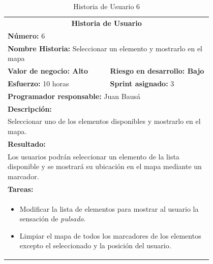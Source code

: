 	\begin{table}[H]
	  \centering 
	 	\begin{tabular}{p{0.4\linewidth}p{0.4\linewidth}}
	    \toprule
	    \multicolumn{2}{c}{\cellcolor{black!30}\textbf{Historia de Usuario}} 													\\
		\multicolumn{2}{l}{\cellcolor{gray!25}\textbf{Número: }6}																\\
		\multicolumn{2}{l}{\textbf{Nombre Historia: } Seleccionar un elemento y mostrarlo en el mapa}							\\
		\cellcolor{gray!25}\textbf{Valor de negocio: Alto}	&	\cellcolor{gray!25}\textbf{Riesgo en desarrollo: Bajo}		\\
		\textbf{Esfuerzo:} 10 horas				&	\textbf{Sprint asignado: }3 												\\
		\multicolumn{2}{l}{\cellcolor{gray!25}\textbf{Programador responsable: }Juan Bausá}									\\
		\multicolumn{2}{l}{\textbf{Descripción:}}                                                     						\\
		\multicolumn{2}{l}{\parbox{15cm}{Seleccionar uno de los elementos disponibles y mostrarlo en el mapa.}}				\\
		\multicolumn{2}{l}{\cellcolor{gray!25}\textbf{Resultado:}}																\\		
		\multicolumn{2}{l}{\parbox{15cm}{Los usuarios podrán seleccionar un elemento de la lista disponible y se mostrará su ubicación en el mapa mediante un marcador.}}																									\\
		\multicolumn{2}{l}{\textbf{Tareas:}}																					\\
		\multicolumn{2}{l}{
			\begin{minipage}{12cm}
	    		\vskip 4pt
	    		\begin{itemize}
	    			\item Modificar la lista de elementos para mostrar al usuario la sensación de \textit{pulsado}.
	    			\item Limpiar el mapa de todos los marcadores de los elementos excepto el seleccionado y la posición del usuario.
				\end{itemize}
			  	\vskip 4pt
		 	\end{minipage}
		} \\																				
	    \hline
	  \end{tabular}
	  \caption{Historia de Usuario 6}
	\end{table}
	

